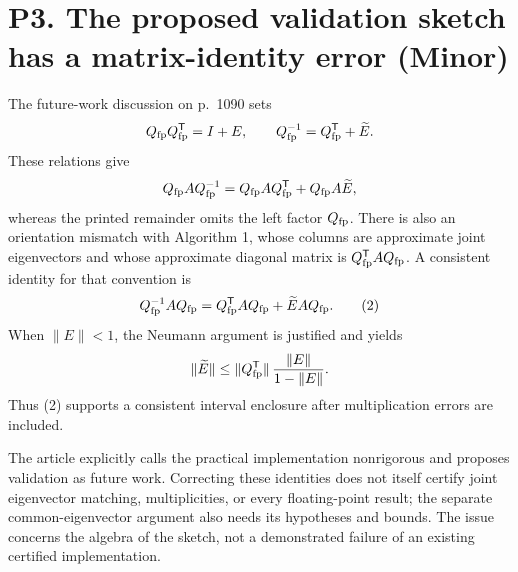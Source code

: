 \documentclass[10pt]{article}
\begin{document}
\section*{P3. The proposed validation sketch has a matrix-identity error (Minor)}
The future-work discussion on p. 1090 sets \[Q_{\rm fp}Q_{\rm fp}^{\mathsf T}=I+E,\qquad
 Q_{\rm fp}^{-1}=Q_{\rm fp}^{\mathsf T}+\widetilde E.\] These relations give \[Q_{\rm fp}A Q_{\rm fp}^{-1}
  =Q_{\rm fp}A Q_{\rm fp}^{\mathsf T}
    +Q_{\rm fp}A\widetilde E,\] whereas the printed remainder omits the left factor \(Q_{\rm fp}\). There is also an orientation mismatch with Algorithm 1, whose columns are approximate joint eigenvectors and whose approximate diagonal matrix is \(Q_{\rm fp}^{\mathsf T}A Q_{\rm fp}\). A consistent identity for that convention is \[Q_{\rm fp}^{-1}A Q_{\rm fp}
   =Q_{\rm fp}^{\mathsf T}A Q_{\rm fp}
       +\widetilde E A Q_{\rm fp}.
 \tag{2}\] When \(\|E\|<1\), the Neumann argument is justified and yields \[\|\widetilde E\|
 \leq \|Q_{\rm fp}^{\mathsf T}\|\,\frac{\|E\|}{1-\|E\|}.\] Thus (2) supports a consistent interval enclosure after multiplication errors are included.\par
The article explicitly calls the practical implementation nonrigorous and proposes validation as future work. Correcting these identities does not itself certify joint eigenvector matching, multiplicities, or every floating-point result; the separate common-eigenvector argument also needs its hypotheses and bounds. The issue concerns the algebra of the sketch, not a demonstrated failure of an existing certified implementation.\par
\end{document}
